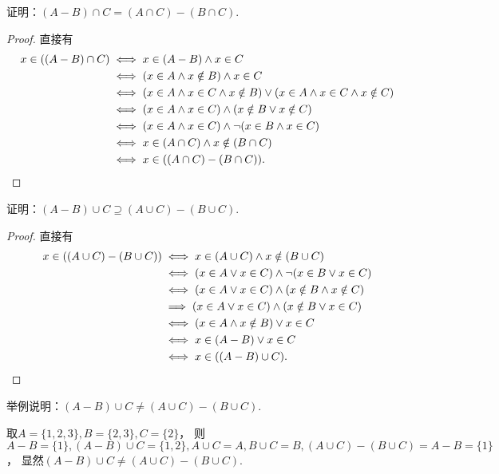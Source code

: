 \begin{example}
证明：\((A - B) \cap C = (A \cap C) - (B \cap C)\).
\begin{proof}
直接有\begin{align*}
	x \in ((A - B) \cap C)
	&\iff
	x \in (A - B)
	\land
	x \in C \\
	&\iff
	(
		x \in A
		\land
		x \notin B
	)
	\land
	x \in C \\
	&\iff
	(
		x \in A
		\land
		x \in C
		\land
		x \notin B
	)
	\lor
	(
		x \in A
		\land
		x \in C
		\land
		x \notin C
	) \\
	&\iff
	(
		x \in A
		\land
		x \in C
	)
	\land
	(
		x \notin B
		\lor
		x \notin C
	) \\
	&\iff
	(
		x \in A
		\land
		x \in C
	)
	\land
	\neg(
		x \in B
		\land
		x \in C
	) \\
	&\iff
	x \in (A \cap C)
	\land
	x \notin (B \cap C) \\
	&\iff
	x \in ((A \cap C) - (B \cap C)).
	\qedhere
\end{align*}
\end{proof}
\end{example}

\begin{example}
证明：\((A - B) \cup C \supseteq (A \cup C) - (B \cup C)\).
\begin{proof}
直接有\begin{align*}
	x \in ((A \cup C) - (B \cup C))
	&\iff
	x \in (A \cup C)
	\land
	x \notin (B \cup C) \\
	&\iff
	(
		x \in A
		\lor
		x \in C
	)
	\land
	\neg(
		x \in B
		\lor
		x \in C
	) \\
	&\iff
	(
		x \in A
		\lor
		x \in C
	)
	\land
	(
		x \notin B
		\land
		x \notin C
	) \\
	&\implies
	(
		x \in A
		\lor
		x \in C
	)
	\land
	(
		x \notin B
		\lor
		x \in C
	) \\
	&\iff
	(
		x \in A
		\land
		x \notin B
	)
	\lor
	x \in C \\
	&\iff
	x \in (A - B)
	\lor
	x \in C \\
	&\iff
	x \in ((A - B) \cup C).
	\qedhere
\end{align*}
\end{proof}
\end{example}

\begin{example}
举例说明：\((A - B) \cup C \neq (A \cup C) - (B \cup C)\).
\begin{solution}
取\(A = \{1,2,3\},
B = \{2,3\},
C = \{2\}\)，
则\(A - B = \{1\},
(A - B) \cup C = \{1,2\},
A \cup C = A,				\allowbreak
B \cup C = B,
(A \cup C) - (B \cup C)
= A - B = \{1\}\)，
显然\((A - B) \cup C \neq (A \cup C) - (B \cup C)\).
\end{solution}
\end{example}

